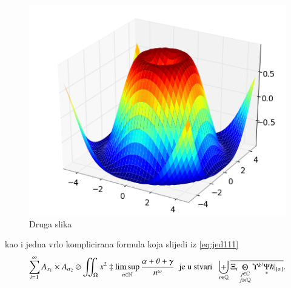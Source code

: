 \documentclass[a4paper,twoside,12pt]{memoir} %
\begin{document}
\begin{figure}[h!t]
\centering \includegraphics{surface3d.png}
\caption{Druga slika}
\label{fig:3d}
\end{figure}

kao i jedna vrlo komplicirana formula koja slijedi iz \eqref{eq:jed111}
\[ \sum_{i=1}^{\infty}A_{x_1}\times A_{{\alpha}_2}\oslash\iint_{\Omega}x^2\ddagger\limsup_{n\in\mathbb{N}}\frac{\alpha+\theta+\gamma}{n^{\omega}}\;\;\text{je u stvari}\;\;\biguplus_{r\in\mathbb{Q}}\overline{\Xi_i \mathop\Theta_{\substack{j\in\mathbb{C} \\ j\ni i\mathbb{Q}}} \Upsilon^{k^j} \underset{\ast}{\Psi} \hslash\vert_{\{\alpha\}}}.\]




\pagestyle{empty} %

\end{document}
